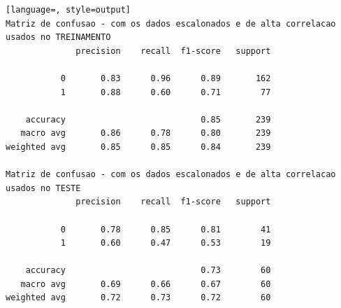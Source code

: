 \begin{lstlisting}[language=, style=output]
Matriz de confusao - com os dados escalonados e de alta correlacao usados no TREINAMENTO
              precision    recall  f1-score   support

           0       0.83      0.96      0.89       162
           1       0.88      0.60      0.71        77

    accuracy                           0.85       239
   macro avg       0.86      0.78      0.80       239
weighted avg       0.85      0.85      0.84       239

Matriz de confusao - com os dados escalonados e de alta correlacao usados no TESTE
              precision    recall  f1-score   support

           0       0.78      0.85      0.81        41
           1       0.60      0.47      0.53        19

    accuracy                           0.73        60
   macro avg       0.69      0.66      0.67        60
weighted avg       0.72      0.73      0.72        60
\end{lstlisting}